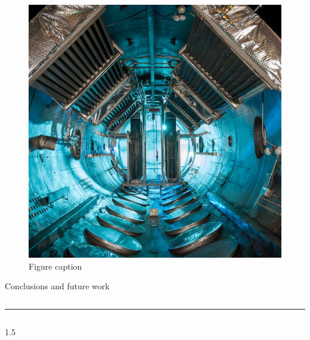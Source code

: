 \documentclass[final, 12pt]{beamer}
\newlength{\onecolwid}
\begin{document}
\begin{frame}[t]
\begin{columns}[t]
\begin{column}{\onecolwid}
\begin{figure}
\centering
\includegraphics[width=\linewidth]{img/nasa-53885}\hspace*{1.5em}
\caption{Figure caption}
\label{fig:fig4}
\end{figure}



\begin{block}{Conclusions and future work}

\lipsum[4]

\end{block}

\end{column} %

\end{columns} %

\hrule

\begin{columns}[t]
\begin{column}{1.5\onecolwid}




\end{column}
\end{columns}
\end{frame}
\end{document}
